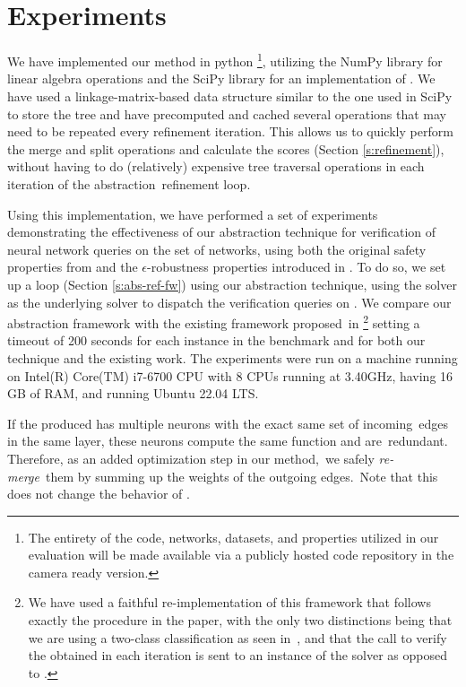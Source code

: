 \section{Experiments} 
We have implemented our method in python \footnote{The entirety of the code, networks, datasets, and properties utilized in our evaluation will be made available via a publicly hosted code repository in the camera ready version.}, utilizing the NumPy library for linear algebra operations and the SciPy library for an implementation of \hcluster. We have used a linkage-matrix-based data structure similar to the one used in SciPy to store the tree and have precomputed and cached several operations that may need to be repeated every refinement iteration. This allows us to quickly perform the merge and split operations and calculate the scores (Section \ref{s:refinement}), without having to do (relatively)
expensive tree traversal operations in each iteration of the abstraction refinement loop.

Using this implementation, we have performed a set of experiments demonstrating the effectiveness of our abstraction technique for verification of neural network queries on the \acasxu set of networks, using both the original safety properties from \cite{reluplex} and the $\epsilon$-robustness properties introduced in \cite{cegar-nn}. To do so, we set up a \cegar loop (Section \ref{s:abs-ref-fw}) using our abstraction technique, using the \neuralsat solver as the underlying solver to dispatch the verification queries on \abs. We compare our abstraction framework with the existing \cegar framework proposed in \cite{cegar-nn} \footnote{We have used a faithful re-implementation of this framework that follows exactly the procedure in the paper, with the only two distinctions being that we are using a two-class classification as seen in \cite{chauhan2022efficiently,liu2022abstraction,10.1145/3644387},
and that the call to verify the \abs obtained in each iteration is sent to an instance of the \neuralsat solver as opposed to \marabou. } setting a timeout of 200 seconds for each instance in the benchmark and for both our technique and the existing work. The experiments were run on a machine running on Intel(R) Core(TM) i7-6700 CPU with 8 CPUs running at 3.40GHz, having 16 GB of RAM, and running Ubuntu 22.04 LTS.


If the \abs produced has multiple neurons with the exact same set of incoming edges in the same layer, these neurons compute the same function and are redundant. Therefore, as an added optimization step in our method, we safely \textit{re-merge} them by summing up the weights of the outgoing edges. Note that this does not change the behavior of \abs.

